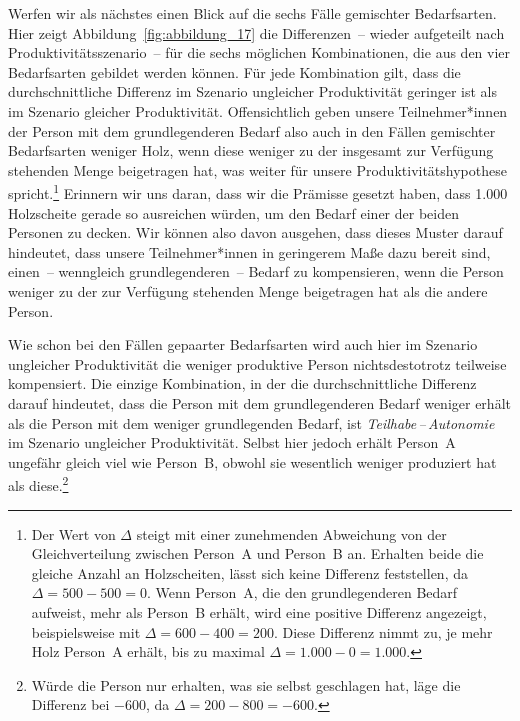 \documentclass[justified,nobib,symmetric,twoside]{tufte-handout}
\begin{document}
Werfen wir als nächstes einen Blick auf die sechs Fälle gemischter Bedarfsarten.
Hier zeigt Abbildung~\ref{fig:abbildung_17} die Differenzen~-- wieder aufgeteilt nach Produktivitätsszenario~-- für die sechs möglichen Kombinationen, die aus den vier Bedarfsarten gebildet werden können.
Für jede Kombination gilt, dass die durchschnittliche Differenz im Szenario ungleicher Produktivität geringer ist als im Szenario gleicher Produktivität.
Offensichtlich geben unsere Teilnehmer*innen der Person mit dem grundlegenderen Bedarf also auch in den Fällen gemischter Bedarfsarten weniger Holz, wenn diese weniger zu der insgesamt zur Verfügung stehenden Menge beigetragen hat, was weiter für unsere Produktivitätshypothese spricht.\footnote{Der Wert von $\Delta$ steigt mit einer zunehmenden Abweichung von der Gleichverteilung zwischen Person~A und Person~B an. Erhalten beide die gleiche Anzahl an Holzscheiten, lässt sich keine Differenz feststellen, da $\Delta = \textrm{500} - \textrm{500} = \textrm{0}$. Wenn Person~A, die den grundlegenderen Bedarf aufweist, mehr als Person~B erhält, wird eine posi\-tive Differenz angezeigt, beispielsweise mit $\Delta = \textrm{600} - \textrm{400} = \textrm{200}$. Diese Differenz nimmt zu, je mehr Holz Person~A erhält, bis zu maximal $\Delta = \textrm{1.000} - \textrm{0} = \textrm{1.000}$.} Erinnern wir uns daran, dass wir die Prämisse gesetzt haben, dass 1.000 Holzscheite gerade so ausreichen würden, um den Bedarf einer der beiden Personen zu decken.
Wir können also davon ausgehen, dass dieses Muster darauf hindeutet, dass unsere Teilnehmer*innen in geringerem Maße dazu bereit sind, einen~-- wenngleich grundlegenderen~-- Bedarf zu kompensieren, wenn die Person weniger zu der zur Verfügung stehenden Menge beigetragen hat als die andere Person.

Wie schon bei den Fällen gepaarter Bedarfsarten wird auch hier im Szenario ungleicher Produktivität die weniger produktive Person nichtsdestotrotz teilweise kompensiert.
Die einzige Kombination, in der die durchschnittliche Differenz darauf hindeutet, dass die Person mit dem grundlegenderen Bedarf weniger erhält als die Person mit dem weniger grundlegenden Bedarf, ist \textit{Teilhabe\,--\,Autonomie} im Szenario ungleicher Produktivität.
Selbst hier jedoch erhält Person~A ungefähr gleich viel wie Person~B, obwohl sie wesentlich weniger produziert hat als diese.\footnote{Würde die Person nur erhalten, was sie selbst geschlagen hat, läge die Differenz bei $-\textrm{600}$, da $\Delta = \textrm{200} - \textrm{800} = -\textrm{600}$.}
\end{document}
